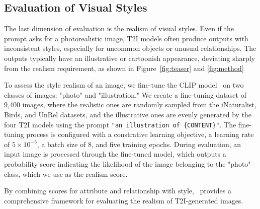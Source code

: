\subsection{Evaluation of Visual Styles}
The last dimension of evaluation is the realism of visual styles. Even if the prompt asks for a photorealistic image, T2I models often produce outputs with inconsistent styles, especially for uncommon objects or unusual relationships. The outputs typically have an illustrative or cartoonish appearance, deviating sharply from the realism requirement, as shown in Figure~\ref{fig:teaser} and \ref{fig:method}

To assess the style realism of an image, we fine-tune the CLIP model~\cite{clip} on two classes of images: "photo" and "illustration." We create a fine-tuning dataset of 9,400 images, where the realistic ones are randomly sampled from the iNaturalist, Birds, and UnRel datasets, and the illustrative ones are evenly generated by the four T2I models using the prompt \texttt{"an illustration of \{CONTENT\}"}. The fine-tuning process is configured with a constrative learning objective, a learning rate of $5 \times 10^{-5}$, a batch size of 8, and five training epochs. During evaluation, an input image is processed through the fine-tuned model, which outputs a probability score indicating the likelihood of the image belonging to the "photo" class, which we use as the realism score.

By combining scores for attribute and relationship with style, \name~provides a comprehensive framework for evaluating the realism of T2I-generated images.

